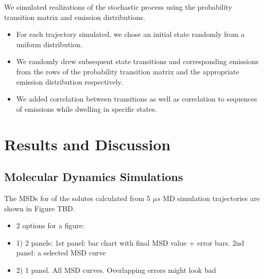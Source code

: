 \documentclass{article}
\begin{document}
  We simulated realizations of the stochastic process using the probability transition
  matrix and emission distributions.
  \begin{itemize}
    \item For each trajectory simulated, we chose an initial state randomly from a 
    uniform distribution. %
    \item We randomly drew subsequent state transitions and corresponding emissions 
    from the rows of the probability transition matrix and the appropriate emission
    distribution respectively.
    \item We added correlation between transitions as well as correlation to sequences
    of emissions while dwelling in specific states.
  \end{itemize}
  

  \section{Results and Discussion}
  
  \subsection{Molecular Dynamics Simulations}\label{section:MD_simulations}
  
  The MSDs for of the solutes calculated from 5 $\mu s$ MD simulation trajectories
  are shown in Figure TBD.
  \begin{itemize}
    \item 2 options for a figure:
    \item 1) 2 panels: 1st panel: bar chart with final MSD value + error bars. 2nd panel: a selected MSD curve
    \item 2) 1 panel. All MSD curves. Overlapping errors might look bad
  \end{itemize}
  
\end{document}
